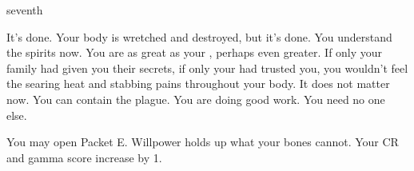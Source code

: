 \documentclass[greennotebook]{Pestilence} %
\begin{document}
\begin{page}{seventh}

It's done. Your body is wretched and destroyed, but it's done. You understand the spirits now. You are as great as your \cElder{\parent}, perhaps even greater. If only your family had given you their secrets, if only your \cElder{\parent} had trusted you, you wouldn't feel the searing heat and stabbing pains throughout your body. It does not matter now. You can contain the plague. You are doing good work. You need no one else. 

You may open Packet E. Willpower holds up what your bones cannot. Your CR and gamma score increase by 1.

\end{page}

\endnotebook
\end{document}
